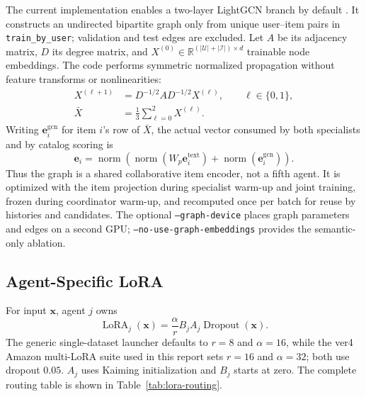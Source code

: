 \documentclass[11pt,a4paper]{article}
\newcommand{\R}{\mathbb{R}}
\begin{document}
The current implementation enables a two-layer LightGCN branch by default
\cite{LIGHTGCN}. It constructs an undirected bipartite graph only from unique
user--item pairs in \texttt{train\_by\_user}; validation and test edges are
excluded. Let $A$ be its adjacency matrix, $D$ its degree matrix, and
$X^{(0)}\in\R^{(|\mathcal U|+|\mathcal I|)\times d}$ trainable node embeddings.
The code performs symmetric normalized propagation without feature transforms
or nonlinearities:
\begin{align}
  X^{(\ell+1)} &= D^{-1/2}AD^{-1/2}X^{(\ell)},\qquad \ell\in\{0,1\},\\
  \bar X &= \frac{1}{3}\sum_{\ell=0}^{2}X^{(\ell)}.
\end{align}
Writing $\bm e_i^{\mathrm{gcn}}$ for item $i$'s row of $\bar X$, the actual
vector consumed by both specialists and by catalog scoring is
\begin{equation}
  \bm e_i=\operatorname{norm}\!\left(
    \operatorname{norm}(W_p\bm e_i^{\mathrm{text}})+
    \operatorname{norm}(\bm e_i^{\mathrm{gcn}})
  \right).
\end{equation}
Thus the graph is a shared collaborative item encoder, not a fifth agent. It is
optimized with the item projection during specialist warm-up and
joint training, frozen during coordinator warm-up, and recomputed once per
batch for reuse by histories and candidates. The optional
\texttt{--graph-device} places graph parameters and edges on a second GPU;
\texttt{--no-use-graph-embeddings} provides the semantic-only ablation.

\subsection{Agent-Specific LoRA}

For input $\bm x$, agent $j$ owns
\begin{equation}
  \operatorname{LoRA}_j(\bm x)
  =
  \frac{\alpha}{r}B_jA_j\operatorname{Dropout}(\bm x).
\end{equation}
The generic single-dataset launcher defaults to $r=8$ and $\alpha=16$, while
the ver4 Amazon multi-LoRA suite used in this report sets $r=16$ and
$\alpha=32$; both use dropout $0.05$. $A_j$ uses Kaiming initialization and
$B_j$ starts at zero. The complete routing table is shown in
Table~\ref{tab:lora-routing}.
\end{document}
